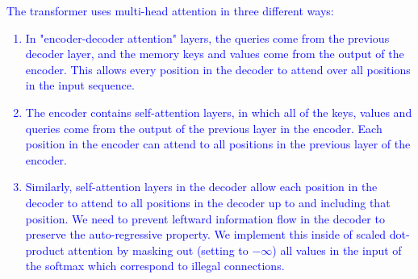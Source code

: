 \documentclass{article}
\begin{document}
	\textcolor{blue}{
		The transformer uses multi-head attention in three different ways:
		\begin{enumerate}
			\item In "encoder-decoder attention" layers, the queries come from the previous decoder layer, 
			and the memory keys and values come from the output of the encoder. This allows every 
			position 
			in the decoder to attend over all positions in the input sequence.
			\item The encoder contains self-attention layers, in which all of the keys, values 
			and queries come from the output of the previous layer in the encoder. 
			Each position in the encoder can attend to all positions in the previous layer of the encoder.
			\item Similarly, self-attention layers in the decoder allow each position in the decoder to attend 
			to 
			all positions in the decoder up to and including that position. We need to prevent leftward 
			information flow in the decoder to preserve the auto-regressive property. We implement this 
			inside of scaled dot-product attention by masking out (setting to $-\infty$) all values in the 
			input 
			of the softmax which correspond to illegal connections. 
		\end{enumerate}
	}

	\clearpage %
	
	
	\clearpage
	
	
	
\end{document}

